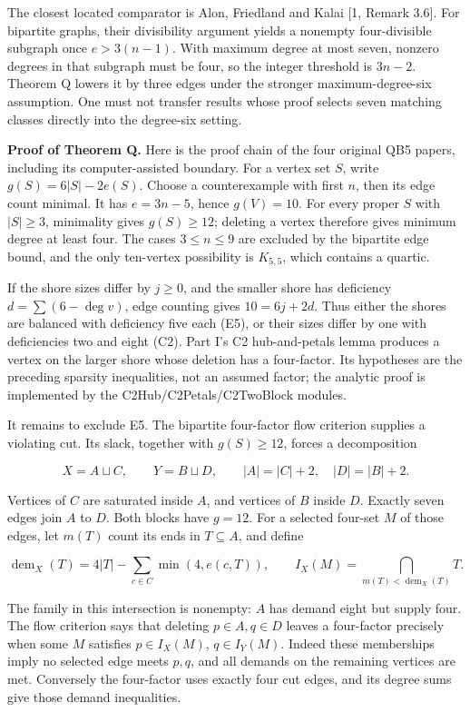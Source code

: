 \documentclass[
  11pt,
]{article}
\newcounter{none} %
\begin{document}
The closest located comparator is Alon, Friedland and Kalai {[}1, Remark
3.6{]}. For bipartite graphs, their divisibility argument yields a
nonempty four-divisible subgraph once \(e>3(n-1)\). With maximum degree
at most seven, nonzero degrees in that subgraph must be four, so the
integer threshold is \(3n-2\). Theorem Q lowers it by three edges under
the stronger maximum-degree-six assumption. One must not transfer
results whose proof selects seven matching classes directly into the
degree-six setting.

\textbf{Proof of Theorem Q.} Here is the proof chain of the four
original QB5 papers, including its computer-assisted boundary. For a
vertex set \(S\), write \(g(S)=6|S|-2e(S)\). Choose a counterexample
with first \(n\), then its edge count minimal. It has \(e=3n-5\), hence
\(g(V)=10\). For every proper \(S\) with \(|S|\ge3\), minimality gives
\(g(S)\ge12\); deleting a vertex therefore gives minimum degree at least
four. The cases \(3\le n\le9\) are excluded by the bipartite edge bound,
and the only ten-vertex possibility is \(K_{5,5}\), which contains a
quartic.

If the shore sizes differ by \(j\ge0\), and the smaller shore has
deficiency \(d=\sum(6-\deg v)\), edge counting gives \(10=6j+2d\). Thus
either the shores are balanced with deficiency five each (E5), or their
sizes differ by one with deficiencies two and eight (C2). Part I's C2
hub-and-petals lemma produces a vertex on the larger shore whose
deletion has a four-factor. Its hypotheses are the preceding sparsity
inequalities, not an assumed factor; the analytic proof is implemented
by the C2Hub/C2Petals/C2TwoBlock modules.

It remains to exclude E5. The bipartite four-factor flow criterion
supplies a violating cut. Its slack, together with \(g(S)\ge12\), forces
a decomposition

\[
X=A\sqcup C,\qquad Y=B\sqcup D,\qquad
|A|=|C|+2,\quad |D|=|B|+2.
\]

Vertices of \(C\) are saturated inside \(A\), and vertices of \(B\)
inside \(D\). Exactly seven edges join \(A\) to \(D\). Both blocks have
\(g=12\). For a selected four-set \(M\) of those edges, let \(m(T)\)
count its ends in \(T\subseteq A\), and define

\[
\operatorname{dem}_X(T)=4|T|-\sum_{c\in C}\min(4,e(c,T)),\qquad
I_X(M)=\bigcap_{m(T)<\operatorname{dem}_X(T)}T.
\]

The family in this intersection is nonempty: \(A\) has demand eight but
supply four. The flow criterion says that deleting \(p\in A,q\in D\)
leaves a four-factor precisely when some \(M\) satisfies
\(p\in I_X(M)\), \(q\in I_Y(M)\). Indeed these memberships imply no
selected edge meets \(p,q\), and all demands on the remaining vertices
are met. Conversely the four-factor uses exactly four cut edges, and its
degree sums give those demand inequalities.
\end{document}
